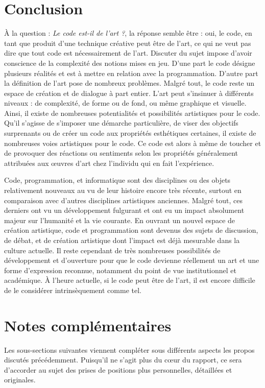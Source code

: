 \documentclass[12pt]{article} %
\begin{document}
\section{Conclusion}
À la question : \textit{Le code est-il de l'art ?}, la réponse semble être : oui, le code, en tant que produit d'une technique créative peut être de l'art, ce qui ne veut pas dire que tout code est nécessairement de l'art. Discuter du sujet impose d'avoir conscience de la complexité des notions mises en jeu. D'une part le code désigne plusieurs réalités et est à mettre en relation avec la programmation. D'autre part la définition de l'art pose de nombreux problèmes. Malgré tout, le code reste un espace de création et de dialogue à part entier. L'art peut s'insinuer à différents niveaux : de complexité, de forme ou de fond, ou même graphique et visuelle. Ainsi, il existe de nombreuses potentialités et possibilités artistiques pour le code. Qu'il s'agisse de s'imposer une démarche particulière, de viser des objectifs surprenants ou de créer un code aux propriétés esthétiques certaines, il existe de nombreuses voies artistiques pour le code. Ce code est alors à même de toucher et de provoquer des réactions ou sentiments selon les propriétés généralement attribuées aux œuvres d'art chez l'individu qui en fait l'expérience.

Code, programmation, et informatique sont des disciplines ou des objets relativement nouveaux au vu de leur histoire encore très récente, surtout en comparaison avec d'autres disciplines artistiques anciennes. Malgré tout, ces derniers ont vu un développement fulgurant et ont eu un impact absolument majeur sur l'humanité et la vie courante. En ouvrant un nouvel espace de création artistique, code et programmation sont devenus des sujets de discussion, de débat, et de création artistique dont l'impact est déjà mesurable dans la culture actuelle. Il reste cependant de très nombreuses possibilités de développement et d'ouverture pour que le code devienne réellement un art et une forme d'expression reconnue, notamment du point de vue institutionnel et académique. À l'heure actuelle, si le code peut être de l'art, il est encore difficile de le considérer intrinsèquement comme tel.

\newpage
\section{Notes complémentaires}
Les sous-sections suivantes viennent compléter sous différents aspects les propos discutés précédemment. Puisqu'il ne s'agit plus du cœur du rapport, ce sera d'accorder au sujet des prises de positions plus personnelles, détaillées et originales. 
\end{document}
